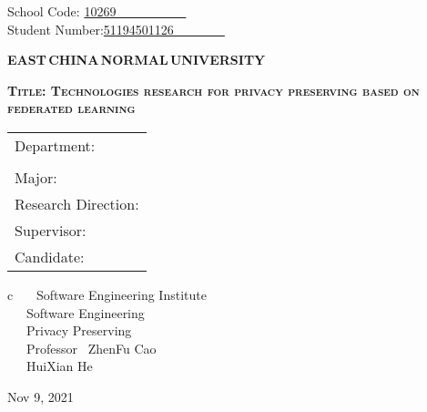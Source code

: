 \newpage

\pagestyle{empty}

\hskip 1.4cm {School Code: \underline{10269~~~~~~~~~~~\qquad}}\\
\hspace*{\fill} {Student Number:\underline{51194501126~~~~~~~~}}
\vskip 2cm

\begin{center}
{\Huge \bf EAST\,CHINA\,NORMAL\,UNIVERSITY}
\end{center}

\vskip 3cm

\begin{center}
{\huge \bf \scshape Title: Technologies research for privacy preserving based on federated learning}
\end{center}

\vskip 2cm {\large
\begin{center}
\begin{tabular}{l}
Department:\\
			\\
Major:\\
Research Direction:\\
Supervisor:\\
Candidate:
\end{tabular}
\begin{tabular}c
~~~Software Engineering Institute\\
\hline ~~~Software Engineering  \\
\hline ~~~Privacy Preserving\\
\hline ~~~Professor ~ZhenFu Cao~  \\
\hline ~~~HuiXian He  \\
\hline
\end{tabular}
\end{center}}

\vskip 30mm

\begin{center}
{\Large Nov 9, 2021}
\end{center}
